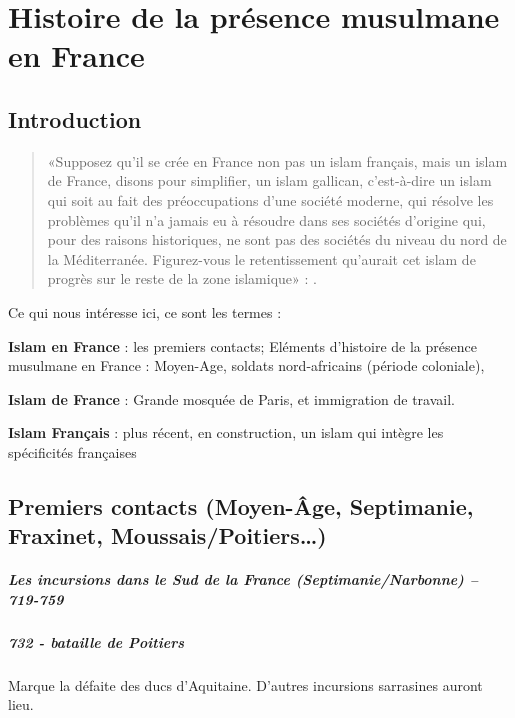 \chapter{Histoire de la présence musulmane en France}


\section{Introduction}


\begin{quote}
    «{Supposez qu’il se crée en France non pas un islam français, mais un islam de France, disons pour simplifier, un islam gallican,} c’est-à-dire un islam qui soit au fait des préoccupations d’une société moderne, qui résolve les problèmes qu’il n’a jamais eu à résoudre dans ses sociétés d’origine qui, pour des raisons historiques, ne sont pas des sociétés du niveau du nord de la Méditerranée. Figurez-vous le retentissement qu’aurait cet islam de progrès sur le reste de la zone islamique»  : .

\end{quote}

Ce qui nous intéresse ici, ce sont les termes : 
\bi
\item \textbf{Islam en France} : les premiers contacts; Eléments d’histoire de la présence musulmane en France : Moyen-Age, soldats
nord-africains (période coloniale), 
\item \textbf{Islam de France} : Grande mosquée de Paris, et immigration de
travail.
\item \textbf{Islam Français} : plus récent, en construction, un islam qui intègre les spécificités françaises

\ei
\section{Premiers contacts (Moyen-Âge, Septimanie, Fraxinet, Moussais/Poitiers…)}



\paragraph{Les incursions dans le Sud de la France (Septimanie/Narbonne) – 719-759}

\paragraph{732 - bataille de Poitiers} Marque la défaite des ducs d'Aquitaine. D'autres incursions sarrasines auront lieu. 


